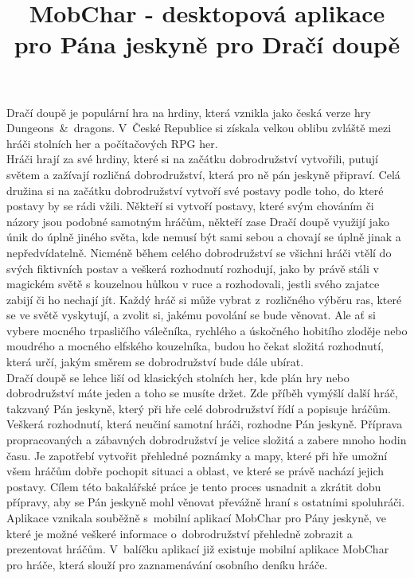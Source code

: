\documentclass[thesis=B,czech]{resources/FITthesis}[2012/06/26]
\title{	MobChar - desktopová aplikace pro Pána jeskyně pro Dračí doupě}
\begin{document}

\begin{introduction}
Dračí doupě je populární hra na hrdiny, která vznikla jako česká verze hry Dungeons~\&~dragons. V~České Republice si získala velkou oblibu zvláště mezi hráči stolních her a počítačových RPG her.\\

Hráči hrají za své hrdiny, které si na začátku dobrodružství vytvořili, putují světem a zažívají rozličná dobrodružství, která pro ně pán jeskyně připraví. Celá družina si na začátku dobrodružství vytvoří své postavy podle toho, do které postavy by se rádi vžili. Někteří si vytvoří postavy, které svým chováním či názory jsou podobné samotným hráčům, někteří zase Dračí doupě využijí jako únik do úplně jiného světa, kde nemusí být sami sebou a chovají se úplně jinak a nepředvídatelně. Nicméně během celého dobrodružství se všichni hráči vtělí do svých fiktivních postav a veškerá rozhodnutí rozhodují, jako by právě stáli v magickém světě s kouzelnou hůlkou v ruce a rozhodovali, jestli svého zajatce zabijí či ho nechají jít.
Každý hráč si může vybrat z~rozličného výběru ras, které se ve světě vyskytují, a zvolit si, jakému povolání se bude věnovat. Ale ať si vybere mocného trpasličího válečníka, rychlého a úskočného hobitího zloděje nebo moudrého a mocného elfského kouzelníka, budou ho čekat složitá rozhodnutí, která určí, jakým směrem se dobrodružství bude dále ubírat. \\

Dračí doupě se lehce liší od klasických stolních her, kde plán hry nebo dobrodružství máte jeden a toho se musíte držet. Zde příběh vymýšlí další hráč, takzvaný Pán jeskyně, který při hře celé dobrodružství řídí a popisuje hráčům. Veškerá rozhodnutí, která neučiní samotní hráči, rozhodne Pán jeskyně. Příprava propracovaných a zábavných dobrodružství je velice složitá a zabere mnoho hodin času. Je zapotřebí vytvořit přehledné poznámky a mapy, které při hře umožní všem hráčům dobře pochopit situaci a oblast, ve které se právě nachází jejich postavy. Cílem této bakalářské práce je tento proces usnadnit a zkrátit dobu přípravy, aby se Pán jeskyně mohl věnovat převážně hraní s ostatními spoluhráči. \\

Aplikace vznikala souběžně s~mobilní aplikací MobChar pro Pány jeskyně\cite{Shanel_2017}, ve které je možné veškeré 	informace o~dobrodružství přehledně zobrazit a prezentovat hráčům. V~balíčku aplikací již existuje mobilní aplikace MobChar pro hráče, která slouží pro zaznamenávání osobního deníku hráče\cite{Weberova_2017}. \\



\end{introduction}
\end{document}
